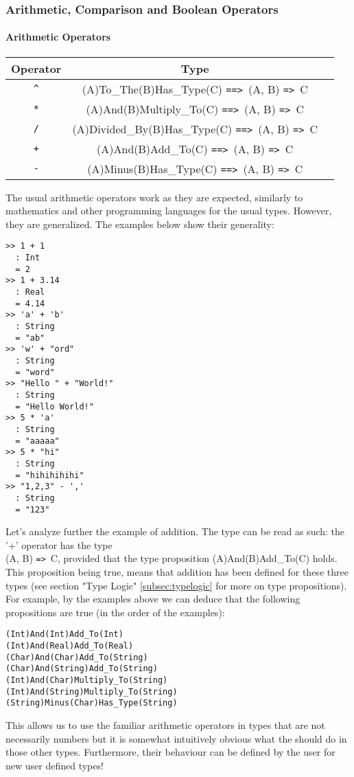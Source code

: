 \documentclass{article}
\def\ra{\texttt{=>}\ }
\def\Ra{\texttt{==>}\ }
\begin{document}
\subsubsection{Arithmetic, Comparison and Boolean Operators}

\paragraph{Arithmetic Operators}
\begin{center}
\begin{tabular}{ |c|c|c| } 
\hline
Operator & Type \\ 
\hline
\hline
\texttt{\^} & (A)To_The(B)Has_Type(C) \Ra (A, B) \ra C \\
\hline
\texttt{*} & (A)And(B)Multiply_To(C) \Ra (A, B) \ra C \\
\hline
\texttt{/} & (A)Divided_By(B)Has_Type(C) \Ra (A, B) \ra C \\
\hline
\texttt{+} & (A)And(B)Add_To(C) \Ra (A, B) \ra C \\ 
\hline
\texttt{-} & (A)Minus(B)Has_Type(C) \Ra (A, B) \ra C \\
\hline
\end{tabular}
\end{center}
The usual arithmetic operators work as they are expected, similarly to
mathematics and other programming languages for the usual types. However, they
are generalized. The examples below show their generality:
\begin{verbatim}
>> 1 + 1
  : Int
  = 2
>> 1 + 3.14
  : Real
  = 4.14
>> 'a' + 'b'
  : String
  = "ab"
>> 'w' + "ord"
  : String
  = "word"
>> "Hello " + "World!"
  : String
  = "Hello World!"
>> 5 * 'a'
  : String
  = "aaaaa"
>> 5 * "hi"
  : String
  = "hihihihihi"
>> "1,2,3" - ','
  : String
  = "123"
\end{verbatim}
Let's analyze further the example of addition. The type can be read as such:
the '+' operator has the type \\ (A, B) \ra C, provided that the type
proposition (A)And(B)Add_To(C) holds. This proposition being true, means that
addition has been defined for these three types (see section "Type Logic"
\ref{subsec:typelogic} for more on type propositions). For example, by the examples
above we can deduce that the following propositions are true (in the order of the 
examples):
\begin{verbatim}
(Int)And(Int)Add_To(Int)
(Int)And(Real)Add_To(Real)
(Char)And(Char)Add_To(String)
(Char)And(String)Add_To(String)
(Int)And(Char)Multiply_To(String)
(Int)And(String)Multiply_To(String)
(String)Minus(Char)Has_Type(String)
\end{verbatim}
This allows us to use the familiar arithmetic operators in types that are not
necessarily numbers but it is somewhat intuitively obvious what the should do
in those other types. Furthermore, their behaviour can be defined by the user
for new user defined types!
\end{document}
